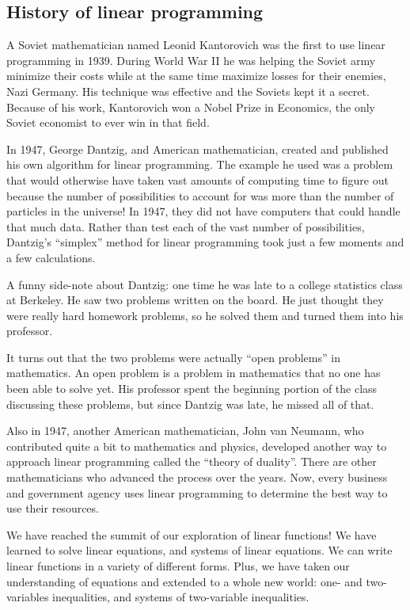 \subsection{History of linear programming}
A Soviet mathematician named Leonid Kantorovich was the first to use linear programming in 1939. During World War II he was helping the Soviet army minimize their costs while at the same time maximize losses for their enemies, Nazi Germany. His technique was effective and the Soviets kept it a secret. Because of his work, Kantorovich won a Nobel Prize in Economics, the only Soviet economist to ever win in that field.

In 1947, George Dantzig, and American mathematician, created and published his own algorithm for linear programming. The example he used was a problem that would otherwise have taken vast amounts of computing time to figure out because the number of possibilities to account for was more than the number of particles in the universe! In 1947, they did not have computers that could handle that much data. Rather than test each of the vast number of possibilities, Dantzig's ``simplex'' method for linear programming took just a few moments and a few calculations.

A funny side-note about Dantzig: one time he was late to a college statistics class at Berkeley. He saw two problems written on the board. He just thought they were really hard homework problems, so he solved them and turned them into his professor.

It turns out that the two problems were actually ``open problems'' in mathematics. An open problem is a problem in mathematics that no one has been able to solve yet. His professor spent the beginning portion of the class discussing these problems, but since Dantzig was late, he missed all of that.

Also in 1947, another American mathematician, John van Neumann, who contributed quite a bit to mathematics and physics, developed another way to approach linear programming called the ``theory of duality''. There are other mathematicians who advanced the process over the years. Now, every business and government agency uses linear programming to determine the best way to use their resources.

\chaptersummary

We have reached the summit of our exploration of linear functions! We have learned to solve linear equations, and systems of linear equations. We can write linear functions in a variety of different forms. Plus, we have taken our understanding of equations and extended to a whole new world: one- and two-variables inequalities, and systems of two-variable inequalities.

